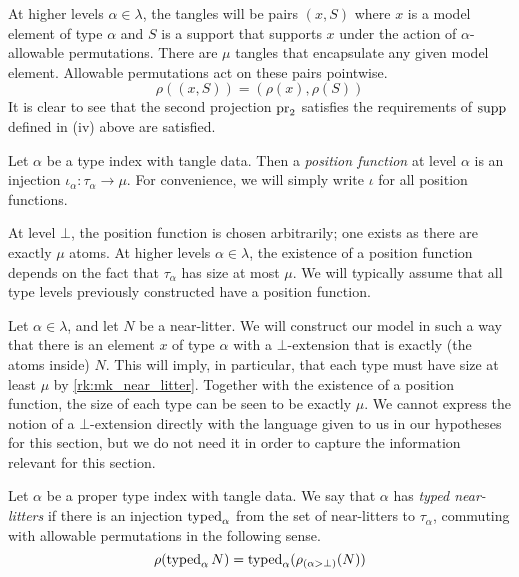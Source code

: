 At higher levels \( \alpha \in \lambda \), the tangles will be pairs \( (x, S) \) where \( x \) is a model element of type \( \alpha \) and \( S \) is a support that supports \( x \) under the action of \( \alpha \)-allowable permutations.
There are \( \mu \) tangles that encapsulate any given model element.
Allowable permutations act on these pairs pointwise.
\[ \rho((x, S)) = (\rho(x), \rho(S)) \]
It is clear to see that the second projection \( \operatorname{pr}_2 \) satisfies the requirements of \( \operatorname{supp} \) defined in (iv) above are satisfied.

\begin{definition}
    Let \( \alpha \) be a type index with tangle data.
    Then a \emph{position function} at level \( \alpha \) is an injection \( \iota_\alpha : \tau_\alpha \to \mu \).
    For convenience, we will simply write \( \iota \) for all position functions.
\end{definition}

At level \( \bot \), the position function is chosen arbitrarily; one exists as there are exactly \( \mu \) atoms.
At higher levels \( \alpha \in \lambda \), the existence of a position function depends on the fact that \( \tau_\alpha \) has size at most \( \mu \).
We will typically assume that all type levels previously constructed have a position function.

Let \( \alpha \in \lambda \), and let \( N \) be a near-litter.
We will construct our model in such a way that there is an element \( x \) of type \( \alpha \) with a \( \bot \)-extension that is exactly (the atoms inside) \( N \).
This will imply, in particular, that each type must have size at least \( \mu \) by \cref{rk:mk_near_litter}.
Together with the existence of a position function, the size of each type can be seen to be exactly \( \mu \).
We cannot express the notion of a \( \bot \)-extension directly with the language given to us in our hypotheses for this section, but we do not need it in order to capture the information relevant for this section.

\begin{definition}
    Let \( \alpha \) be a proper type index with tangle data.
    We say that \( \alpha \) has \emph{typed near-litters} if there is an injection \( \operatorname{typed}_\alpha \) from the set of near-litters to \( \tau_\alpha \), commuting with allowable permutations in the following sense.
    \[ \rho(\operatorname{typed}_\alpha N) = \operatorname{typed}_\alpha (\rho_{(\alpha > \bot)}(N)) \]
\end{definition}

